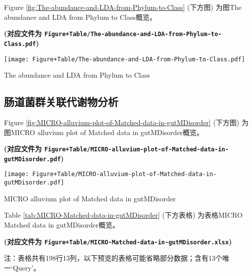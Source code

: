 \documentclass[
]{article}
\begin{document}
Figure \ref{fig:The-abundance-and-LDA-from-Phylum-to-Class} (下方图) 为图The abundance and LDA from Phylum to Class概览。

\textbf{(对应文件为 \texttt{Figure+Table/The-abundance-and-LDA-from-Phylum-to-Class.pdf})}

\def\@captype{figure}
\begin{center}
\texttt{[image: Figure+Table/The-abundance-and-LDA-from-Phylum-to-Class.pdf]}
\caption{The abundance and LDA from Phylum to Class}\label{fig:The-abundance-and-LDA-from-Phylum-to-Class}
\end{center}

\hypertarget{meta}{%
\subsection{肠道菌群关联代谢物分析}\label{meta}}

Figure \ref{fig:MICRO-alluvium-plot-of-Matched-data-in-gutMDisorder} (下方图) 为图MICRO alluvium plot of Matched data in gutMDisorder概览。

\textbf{(对应文件为 \texttt{Figure+Table/MICRO-alluvium-plot-of-Matched-data-in-gutMDisorder.pdf})}

\def\@captype{figure}
\begin{center}
\texttt{[image: Figure+Table/MICRO-alluvium-plot-of-Matched-data-in-gutMDisorder.pdf]}
\caption{MICRO alluvium plot of Matched data in gutMDisorder}\label{fig:MICRO-alluvium-plot-of-Matched-data-in-gutMDisorder}
\end{center}

Table \ref{tab:MICRO-Matched-data-in-gutMDisorder} (下方表格) 为表格MICRO Matched data in gutMDisorder概览。

\textbf{(对应文件为 \texttt{Figure+Table/MICRO-Matched-data-in-gutMDisorder.xlsx})}

\begin{center}\begin{tcolorbox}[colback=gray!10, colframe=gray!50, width=0.9\linewidth, arc=1mm, boxrule=0.5pt]注：表格共有198行13列，以下预览的表格可能省略部分数据；含有13个唯一`Query'。
\end{tcolorbox}
\end{center}
\end{document}
